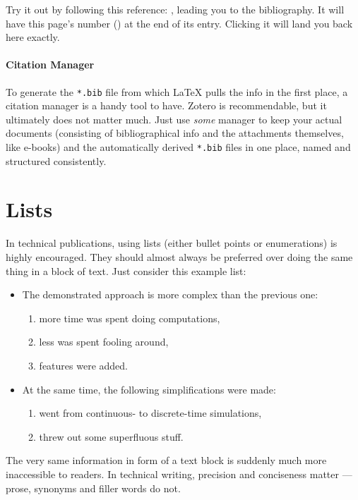 Try it out by following this reference: \cite{dirac_principles_1981},
leading you to the bibliography.
\label{backref_example}
It will have this page's number () at the end of its entry.
Clicking it will land you back here exactly.

\paragraph{Citation Manager}
To generate the \texttt{*.bib} file from which \LaTeX{} pulls the info in the
first place, a citation manager is a handy tool to have.
Zotero is recommendable, but it ultimately does not matter much.
Just use \emph{some} manager to keep your actual documents
(consisting of bibliographical info and the attachments themselves, like e-books)
and the automatically derived \texttt{*.bib} files in one place,
named and structured consistently.

\section{Lists}

In technical publications, using lists (either bullet points or enumerations)
is highly encouraged.
They should almost always be preferred over doing the same thing in a block of text.
Just consider this example list:
\begin{itemize}
    \item The demonstrated approach is more complex than the previous one:
    \begin{enumerate}
        \item more time was spent doing computations,
        \item less was spent fooling around,
        \item features were added.
    \end{enumerate}
    \item At the same time, the following simplifications were made:
    \begin{enumerate}
        \item went from continuous- to discrete-time simulations,
        \item threw out some superfluous stuff.
    \end{enumerate}
\end{itemize}
The very same information in form of a text block is suddenly much more inaccessible
to readers.
In technical writing, precision and conciseness matter --- prose, synonyms and
filler words do not.

